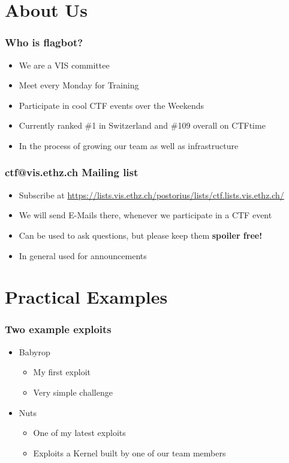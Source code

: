 \documentclass[aspectratio=169]{beamer}
\begin{document}
\section{About Us}

\begin{frame}
    \frametitle{Who is flagbot?}
    \begin{itemize}
        \item We are a VIS committee
        \item Meet every Monday for Training
        \item Participate in cool CTF events over the Weekends
        \item Currently ranked \#1 in Switzerland and \#109 overall on CTFtime
        \item In the process of growing our team as well as infrastructure
    \end{itemize}
\end{frame}

\begin{frame}
    \frametitle{ctf@vis.ethz.ch Mailing list}
    \begin{itemize}
        \item Subscribe at \href{https://lists.vis.ethz.ch/postorius/lists/ctf.lists.vis.ethz.ch/}{https://lists.vis.ethz.ch/postorius/lists/ctf.lists.vis.ethz.ch/}
        \item We will send E-Mails there, whenever we participate in a CTF event
        \item Can be used to ask questions, but please keep them \textbf{spoiler free!}
        \item In general used for announcements
    \end{itemize}
\end{frame}

\section{Practical Examples}

\begin{frame}
    \frametitle{Two example exploits}
    \begin{itemize}
        \item Babyrop
        \begin{itemize}
            \item My first exploit
            \item Very simple challenge
        \end{itemize}
        \item Nuts
        \begin{itemize}
            \item One of my latest exploits
            \item Exploits a Kernel built by one of our team members
        \end{itemize}
    \end{itemize}
\end{frame}
\end{document}
